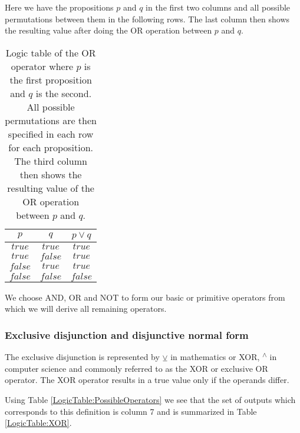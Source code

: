                 Here we have the propositions $p$ and $q$ in the first two columns and all possible permutations between them in the following rows. The last column then shows the resulting value after doing the OR operation between $p$ and $q$.
                
                \begin{table}[h!]
                    \centering
                    \begin{tabular}{|c|c|c|}
                    	\hline
                    	  $p$   &   $q$   & $p \vee q$ \\ \hline
                    	$true$  & $true$  &   $true$   \\ \hline
                    	$true$  & $false$ &   $true$   \\ \hline
                    	$false$ & $true$  &   $true$   \\ \hline
                    	$false$ & $false$ &  $false$   \\ \hline
                    \end{tabular}
                    \caption{Logic table of the OR operator where $p$ is the first proposition and $q$ is the second. All possible permutations are then specified in each row for each proposition. The third column then shows the resulting value of the OR operation between $p$ and $q$.}
                    \label{LogicTable:OR}
                \end{table}
            
                We choose AND, OR and NOT to form our basic or primitive operators from which we will derive all remaining operators.
                
            \subsubsection{Exclusive disjunction and disjunctive normal form}
                
                The exclusive disjunction is represented by $\veebar$ in mathematics or XOR, \textsuperscript{$\wedge$} in computer science and commonly referred to as the XOR or exclusive OR operator. The XOR operator results in a true value only if the operands differ.
                
                Using Table \ref{LogicTable:PossibleOperators} we see that the set of outputs which corresponds to this definition is column 7 and is summarized in Table \ref{LogicTable:XOR}.
                
